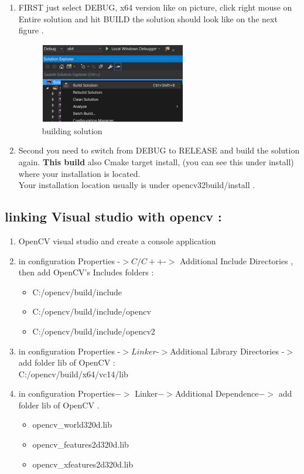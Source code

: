 \begin{enumerate}
\item FIRST just select DEBUG, x64 version like on picture, click right mouse on Entire solution and hit BUILD the  solution should look like on the next figure . 
\begin{figure}[H]
\centering
\includegraphics[width=0.6\textwidth]{img/working3.png}
\caption{ building solution}
\label{fig:working3}
\end{figure}

\item 	Second you need to switch from DEBUG to RELEASE and build the solution again. \textbf{This build} also Cmake target install, (you can see this under install) where  your installation is located. \\
Your installation location usually is under opencv32build/install .


\end{enumerate}

\newpage

\subsection{linking Visual studio with opencv :}

\begin{enumerate}
\item OpenCV visual studio and create a console application 
\item in configuration Properties -$> C/C++ $-$>$ Additional Include Directories , then add OpenCV's Includes folders :
 \begin{itemize}
     \item C:/opencv/build/include
     \item C:/opencv/build/include/opencv
     \item C:/opencv/build/include/opencv2
   \end{itemize}
\item in configuration Properties -$>Linker$-$>$Additional Library Directories -$> $ add folder lib of OpenCV :\\
     C:/opencv/build/x64/vc14/lib 
\item in configuration Properties$->$ Linker$->$Additional Dependence$->$ add folder lib of OpenCV .
 \begin{itemize}
     \item opencv\_world320d.lib
     \item opencv\_features2d320d.lib
     \item opencv\_xfeatures2d320d.lib
   \end{itemize}

\end{enumerate}

